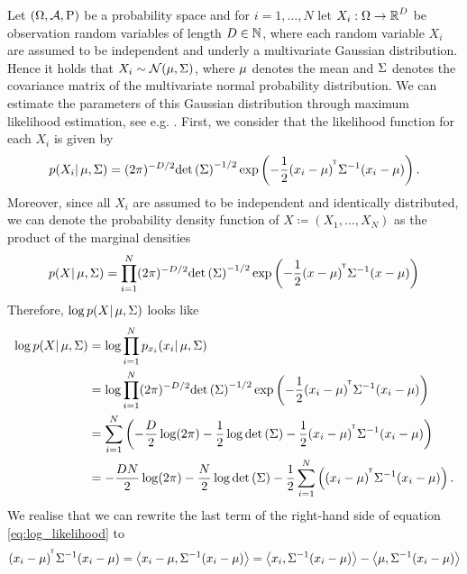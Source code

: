 \begin{example}\label{ex:mle_gaussian}
Let $(\O, \A, \prob)$ be a probability space and for $i=1,\ldots, N$ let $X_i:\O\to\R^{D}$ be observation random variables of length $D\in\N$, where each random variable $X_i$ are assumed to be independent and underly a multivariate Gaussian distribution. Hence it holds that $X_i\sim \mathcal{N}(\m, \S)$, where $\m$ denotes the mean and $\S$ denotes the covariance matrix of the multivariate normal probability distribution. We can estimate the parameters of this Gaussian distribution through maximum likelihood estimation, see e.g. \cite[Section~2.3.4]{bishop2006pattern}. First, we consider that the likelihood function for each $X_i$ is given by
\begin{align*}
p(X_i| \m, \S) = (2\pi)^{-D/2} \det \left( \S \right)^{-1/2} \exp \left( -\frac{1}{2} (x_i - \m)^{\tran}\S^{-1} (x_i - \m) \right).
\end{align*}
Moreover, since all $X_i$ are assumed to be independent and identically distributed, we can denote the probability density function of $X \coloneqq (X_1,\ldots, X_N)$ as the product of the marginal densities
\begin{align*}
p(X| \m, \S) = \prod_{i=1}^N (2\pi)^{-D/2} \det \left( \S \right)^{-1/2} \exp \left( -\frac{1}{2} (x - \m)^{\tran}\S^{-1} (x - \m) \right)
\end{align*}
Therefore, $\log p(X| \m, \S)$ looks like
\begin{align}\label{eq:log_likelihood}
\log p(X| \m, \S) &= \log \prod_{i=1}^N p_{x_i} (x_i|\m, \S)\nonumber\\
&= \log \prod_{i=1}^N (2\pi)^{-D/2} \det \left( \S \right)^{-1/2} \exp \left( -\frac{1}{2} (x_i - \m)^{\tran}\S^{-1} (x_i - \m) \right)\nonumber\\
&= \sum_{i=1}^N \left(-\frac{D}{2} \log(2\pi) - \frac{1}{2}\log \det\left(\S\right) - \frac{1}{2} (x_i - \m)^{\tran}\S^{-1} (x_i - \m) \right)\nonumber\\
&= -\frac{DN}{2}\log(2\pi) - \frac{N}{2} \log \det\left(\S\right) - \frac{1}{2} \sum_{i=1}^N \left( (x_i - \m)^{\tran}\S^{-1} (x_i - \m) \right).
\end{align}
We realise that we can rewrite the last term of the right-hand side of equation \eqref{eq:log_likelihood} to
\begin{align*}
(x_i - \m)^{\tran}\S^{-1} (x_i - \m) &= \left\langle x_i - \m, \S^{-1}(x_i - \m) \right\rangle = \left\langle x_i, \S^{-1}(x_i - \m) \right\rangle - \left\langle \m, \S^{-1}(x_i - \m) \right\rangle\\

\end{align*}
\end{example}
